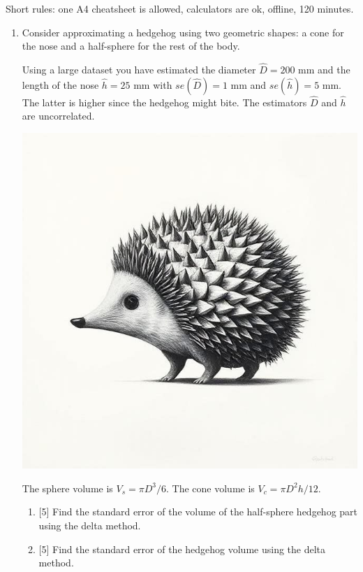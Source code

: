 \documentclass[12pt]{article}
\begin{document}
Short rules: one A4 cheatsheet is allowed, calculators are ok, offline, 120 minutes.

\begin{enumerate}
    \item Consider approximating a hedgehog using two geometric shapes: 
    a cone for the nose and a half-sphere for the rest of the body. 
    
    Using a large dataset you have estimated the diameter $\hat D = 200$ mm and the length of the nose $\hat h = 25$ mm 
    with $se(\hat D) = 1$ mm and $se(\hat h) = 5$ mm.
    The latter is higher since the hedgehog might bite. 
    The estimators $\hat D$ and $\hat h$ are uncorrelated.
    
    \begin{minipage}{\textwidth}
        \includegraphics[scale=0.25]{hedgehog.jpg}
    \end{minipage}
    
    The sphere volume is $V_s = \pi D^3 / 6$. 
    The cone volume is $V_c = \pi D^2 h / 12$. 
    
    \begin{enumerate}
        \item {[5]} Find the standard error of the volume of the half-sphere hedgehog part using the delta method.
        \item {[5]} Find the standard error of the hedgehog volume using the delta method.
    \end{enumerate}
 

\end{enumerate}
\end{document}
